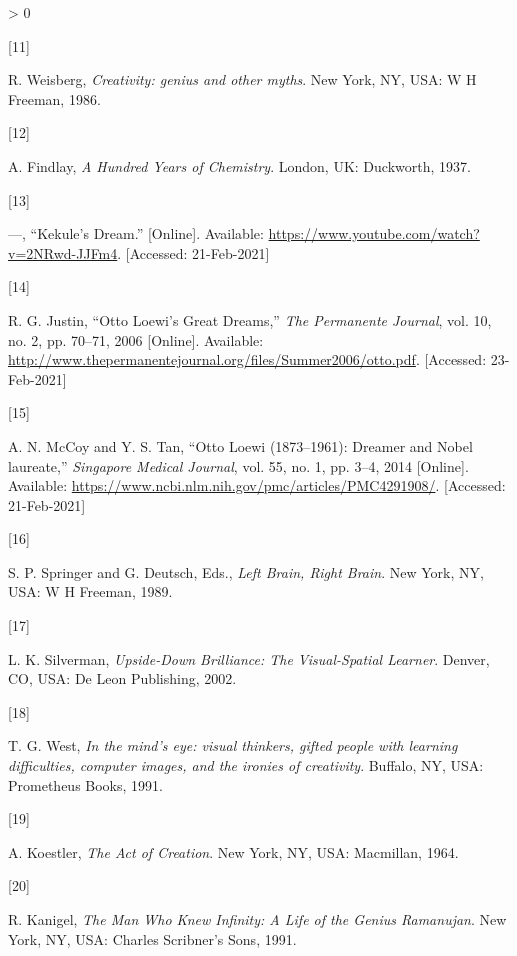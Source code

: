 \documentclass[
  11pt,
  a4paper,
]{article}
\newlength{\cslhangindent}
\newlength{\csllabelwidth}
\newenvironment{CSLReferences}[2] %
 {%
  \setlength{\parindent}{0pt}
  \ifodd #1 \everypar{\setlength{\hangindent}{\cslhangindent}}\ignorespaces\fi
  \ifnum #2 > 0
  \setlength{\parskip}{#2\baselineskip}
  \fi
 }%
 {}
\newcommand{\CSLLeftMargin}[1]{\parbox[t]{\csllabelwidth}{#1}}
\newcommand{\CSLRightInline}[1]{\parbox[t]{\linewidth - \csllabelwidth}{#1}\break}
\begin{document}
\begin{CSLReferences}{0}{0}
\leavevmode\hypertarget{ref-weisberg86}{}%
\CSLLeftMargin{{[}11{]} }
\CSLRightInline{R. Weisberg, \emph{{Creativity: genius and other
myths}}. New York, NY, USA: W H Freeman, 1986. }

\leavevmode\hypertarget{ref-findlay37}{}%
\CSLLeftMargin{{[}12{]} }
\CSLRightInline{A. Findlay, \emph{{A Hundred Years of Chemistry}}.
London, UK: Duckworth, 1937. }

\leavevmode\hypertarget{ref-kekules-dream}{}%
\CSLLeftMargin{{[}13{]} }
\CSLRightInline{---, {``{Kekule's Dream}.''} {[}Online{]}. Available:
\url{https://www.youtube.com/watch?v=2NRwd-JJFm4}. {[}Accessed:
21-Feb-2021{]}}

\leavevmode\hypertarget{ref-justin06}{}%
\CSLLeftMargin{{[}14{]} }
\CSLRightInline{R. G. Justin, {``{Otto Loewi's Great Dreams},''}
\emph{The Permanente Journal}, vol. 10, no. 2, pp. 70--71, 2006
{[}Online{]}. Available:
\url{http://www.thepermanentejournal.org/files/Summer2006/otto.pdf}.
{[}Accessed: 23-Feb-2021{]}}

\leavevmode\hypertarget{ref-loewi2014}{}%
\CSLLeftMargin{{[}15{]} }
\CSLRightInline{A. N. McCoy and Y. S. Tan, {``{Otto Loewi (1873--1961):
Dreamer and Nobel laureate},''} \emph{Singapore Medical Journal}, vol.
55, no. 1, pp. 3--4, 2014 {[}Online{]}. Available:
\url{https://www.ncbi.nlm.nih.gov/pmc/articles/PMC4291908/}.
{[}Accessed: 21-Feb-2021{]}}

\leavevmode\hypertarget{ref-springer89}{}%
\CSLLeftMargin{{[}16{]} }
\CSLRightInline{S. P. Springer and G. Deutsch, Eds., \emph{{Left Brain,
Right Brain}}. New York, NY, USA: W H Freeman, 1989. }

\leavevmode\hypertarget{ref-silver02}{}%
\CSLLeftMargin{{[}17{]} }
\CSLRightInline{L. K. Silverman, \emph{{Upside-Down Brilliance: The
Visual-Spatial Learner}}. Denver, CO, USA: De Leon Publishing, 2002. }

\leavevmode\hypertarget{ref-west91}{}%
\CSLLeftMargin{{[}18{]} }
\CSLRightInline{T. G. West, \emph{{In the mind's eye: visual thinkers,
gifted people with learning difficulties, computer images, and the
ironies of creativity}}. Buffalo, NY, USA: Prometheus Books, 1991. }

\leavevmode\hypertarget{ref-koestler64}{}%
\CSLLeftMargin{{[}19{]} }
\CSLRightInline{A. Koestler, \emph{{The Act of Creation}}. New York, NY,
USA: Macmillan, 1964. }

\leavevmode\hypertarget{ref-kanigel91}{}%
\CSLLeftMargin{{[}20{]} }
\CSLRightInline{R. Kanigel, \emph{{The Man Who Knew Infinity: A Life of
the Genius Ramanujan}}. New York, NY, USA: Charles Scribner's Sons,
1991. }


\end{CSLReferences}
\end{document}
